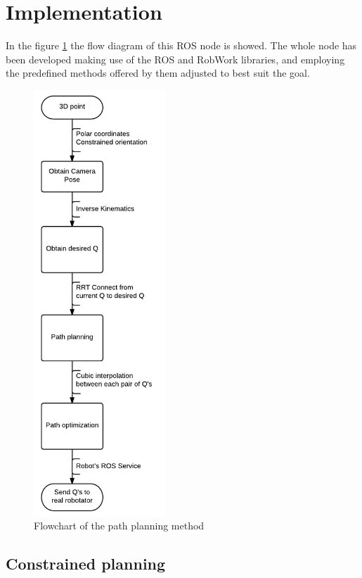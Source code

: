 \section{Implementation} %
\label{sec:implementation_pathplanning}
In the figure \ref{fig:path_planning_flowchart} the flow diagram of this ROS node is showed. The whole node has been developed making use of the ROS and RobWork libraries, and employing the predefined methods offered by them adjusted to best suit the goal.
\begin{figure}[!hb]
	\centering
	\includegraphics[height=16cm]{figures/path_planning_flowchart}
	\caption{Flowchart of the path planning method}
	\label{fig:path_planning_flowchart}
\end{figure}

	\subsection{Constrained planning} %
	\label{sub:contrained_planning_implementation}
